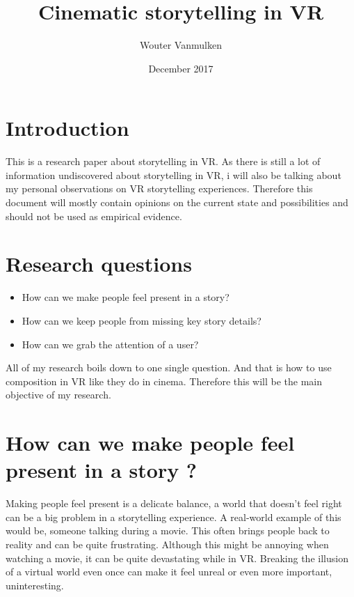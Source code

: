 \documentclass{report}
\title{Cinematic storytelling in VR}
\author{Wouter Vanmulken}
\date{December 2017}
\begin{document}
				\maketitle
				\tableofcontents
				\newpage
		
				\chapter{Introduction}
				
				This is a research paper about storytelling in VR. As there is still a lot of information undiscovered about storytelling in VR, i will also be talking about my personal observations on VR storytelling experiences. Therefore this document will mostly contain opinions on the current state and possibilities and should not be used as empirical evidence.
				
				\chapter{Research questions}
		
				\begin{itemize}
					\item How can we make people feel present in a story?
					\item How can we keep people from missing key story details?
					\item How can we grab the attention of a user?
				\end{itemize}
				\begin{par}
					All of my research boils down to one single question. And that is how to use composition in VR like they do in cinema. Therefore this will be the main objective of my research.
				\end{par}

				
				\chapter{How can we make people feel present in a story ?}
								
				Making people feel present is a delicate balance, a world that doesn't feel right can be a big problem in a storytelling experience. A real-world example of this would be, someone talking during a movie. This often brings people back to reality and can be quite frustrating. Although this might be annoying when watching a movie, it can be quite devastating while in VR. Breaking the illusion of a virtual world even once can make it feel unreal or even more important, uninteresting.
\end{document}
